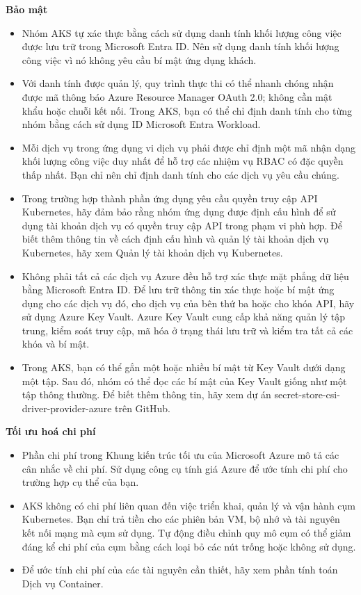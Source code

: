 \textbf{Bảo mật}
    \begin{itemize}
        \item Nhóm AKS tự xác thực bằng cách sử dụng danh tính khối lượng công việc được lưu trữ trong Microsoft Entra ID. Nên sử dụng danh tính khối lượng công việc vì nó không yêu cầu bí mật ứng dụng khách.
        \item Với danh tính được quản lý, quy trình thực thi có thể nhanh chóng nhận được mã thông báo Azure Resource Manager OAuth 2.0; không cần mật khẩu hoặc chuỗi kết nối. Trong AKS, bạn có thể chỉ định danh tính cho từng nhóm bằng cách sử dụng ID Microsoft Entra Workload.
        \item Mỗi dịch vụ trong ứng dụng vi dịch vụ phải được chỉ định một mã nhận dạng khối lượng công việc duy nhất để hỗ trợ các nhiệm vụ RBAC có đặc quyền thấp nhất. Bạn chỉ nên chỉ định danh tính cho các dịch vụ yêu cầu chúng.
        \item Trong trường hợp thành phần ứng dụng yêu cầu quyền truy cập API Kubernetes, hãy đảm bảo rằng nhóm ứng dụng được định cấu hình để sử dụng tài khoản dịch vụ có quyền truy cập API trong phạm vi phù hợp. Để biết thêm thông tin về cách định cấu hình và quản lý tài khoản dịch vụ Kubernetes, hãy xem Quản lý tài khoản dịch vụ Kubernetes.
        \item Không phải tất cả các dịch vụ Azure đều hỗ trợ xác thực mặt phẳng dữ liệu bằng Microsoft Entra ID. Để lưu trữ thông tin xác thực hoặc bí mật ứng dụng cho các dịch vụ đó, cho dịch vụ của bên thứ ba hoặc cho khóa API, hãy sử dụng Azure Key Vault. Azure Key Vault cung cấp khả năng quản lý tập trung, kiểm soát truy cập, mã hóa ở trạng thái lưu trữ và kiểm tra tất cả các khóa và bí mật.
        \item Trong AKS, bạn có thể gắn một hoặc nhiều bí mật từ Key Vault dưới dạng một tập. Sau đó, nhóm có thể đọc các bí mật của Key Vault giống như một tập thông thường. Để biết thêm thông tin, hãy xem dự án secret-store-csi-driver-provider-azure trên GitHub.    
    \end{itemize}
\textbf{Tối ưu hoá chi phí}
    \begin{itemize}
        \item Phần chi phí trong Khung kiến trúc tối ưu của Microsoft Azure mô tả các cân nhắc về chi phí. Sử dụng công cụ tính giá Azure để ước tính chi phí cho trường hợp cụ thể của bạn.
        \item AKS không có chi phí liên quan đến việc triển khai, quản lý và vận hành cụm Kubernetes. Bạn chỉ trả tiền cho các phiên bản VM, bộ nhớ và tài nguyên kết nối mạng mà cụm sử dụng. Tự động điều chỉnh quy mô cụm có thể giảm đáng kể chi phí của cụm bằng cách loại bỏ các nút trống hoặc không sử dụng.
        \item Để ước tính chi phí của các tài nguyên cần thiết, hãy xem phần tính toán Dịch vụ Container.
    \end{itemize}


